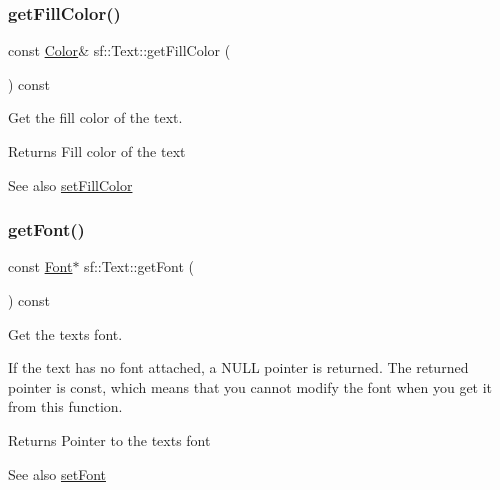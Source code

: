 \subsubsection{\texorpdfstring{getFillColor()}{getFillColor()}}
{\footnotesize\ttfamily const \mbox{\hyperlink{classsf_1_1_color}{Color}}\& sf\+::\+Text\+::get\+Fill\+Color (\begin{DoxyParamCaption}{ }\end{DoxyParamCaption}) const}



Get the fill color of the text. 

\begin{DoxyReturn}{Returns}
Fill color of the text
\end{DoxyReturn}
\begin{DoxySeeAlso}{See also}
\mbox{\hyperlink{classsf_1_1_text_ab7bb3babac5a6da1802b2c3e1a3e6dcc}{set\+Fill\+Color}} \begin{DoxyVerb}\end{DoxyVerb}
 
\end{DoxySeeAlso}
\mbox{\label{classsf_1_1_text_a47cd96d7b2c37b2f820e4d6e1bb83f96}} 
\subsubsection{\texorpdfstring{getFont()}{getFont()}}
{\footnotesize\ttfamily const \mbox{\hyperlink{classsf_1_1_font}{Font}}$\ast$ sf\+::\+Text\+::get\+Font (\begin{DoxyParamCaption}{ }\end{DoxyParamCaption}) const}



Get the text\textquotesingle{}s font. 

If the text has no font attached, a N\+U\+LL pointer is returned. The returned pointer is const, which means that you cannot modify the font when you get it from this function.

\begin{DoxyReturn}{Returns}
Pointer to the text\textquotesingle{}s font
\end{DoxyReturn}
\begin{DoxySeeAlso}{See also}
\mbox{\hyperlink{classsf_1_1_text_a2927805d1ae92d57f15034ea34756b81}{set\+Font}} \begin{DoxyVerb}\end{DoxyVerb}
 
\end{DoxySeeAlso}
\mbox{\label{classsf_1_1_text_ad33ed96ce9fbe99610f7f8b6874a16b4}} 
